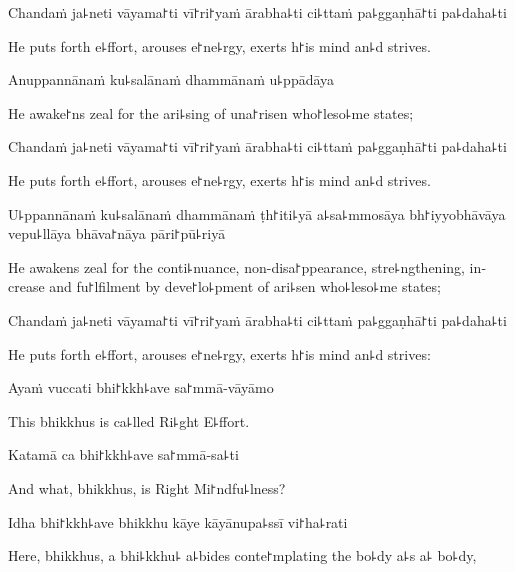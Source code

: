Chandaṁ ja꜕neti vāyama꜓ti vī꜓ri꜓yaṁ ārabha꜕ti ci꜕ttaṁ pa꜕ggaṇhā꜓ti pa꜕daha꜕ti

\begin{english}
  He puts forth e꜕ffort, arouses e꜓ne꜕rgy, exerts h꜓is mind an꜕d strives.
\end{english}

Anuppannānaṁ ku꜕salānaṁ dhammānaṁ u꜕ppādāya

\begin{english}
  He awake꜓ns zeal for the ari꜕sing of una꜓risen who꜓leso꜕me states;
\end{english}

Chandaṁ ja꜕neti vāyama꜓ti vī꜓ri꜓yaṁ ārabha꜕ti ci꜕ttaṁ pa꜕ggaṇhā꜓ti pa꜕daha꜕ti

\begin{english}
  He puts forth e꜕ffort, arouses e꜓ne꜕rgy, exerts h꜓is mind an꜕d strives.
\end{english}

\ifaivedition
\clearpage
\fi

U꜕ppannānaṁ ku꜕salānaṁ dhammānaṁ ṭh꜓iti꜕yā a꜕sa꜕mmosāya bh꜓iyyobhāvāya vepu꜕llāya bhāva꜓nāya pāri꜓pū꜕riyā

\begin{english}
  He awakens zeal for the conti꜕nuance, non-disa꜓ppearance, stre꜕ngthening, increase and fu꜓lfilment by deve꜓lo꜕pment of ari꜕sen who꜕leso꜕me states;
\end{english}

Chandaṁ ja꜕neti vāyama꜓ti vī꜓ri꜓yaṁ ārabha꜕ti ci꜕ttaṁ pa꜕ggaṇhā꜓ti pa꜕daha꜕ti

\begin{english}
  He puts forth e꜕ffort, arouses e꜓ne꜕rgy, exerts h꜓is mind an꜕d strives:
\end{english}

Ayaṁ vuccati bhi꜓kkh꜕ave sa꜓mmā-vāyāmo

\begin{english}
  This bhikkhus is ca꜕lled Ri꜕ght E꜕ffort.
\end{english}

Katamā ca bhi꜓kkh꜕ave sa꜓mmā-sa꜕ti

\begin{english}
  And what, bhikkhus, is Right Mi꜓ndfu꜕lness?
\end{english}

Idha bhi꜓kkh꜕ave bhikkhu kāye kāyānupa꜕ssī vi꜓ha꜕rati

\begin{english}
  Here, bhikkhus, a bhi꜕kkhu꜕ a꜕bides conte꜓mplating the bo꜕dy a꜕s a꜕ bo꜕dy,
\end{english}


